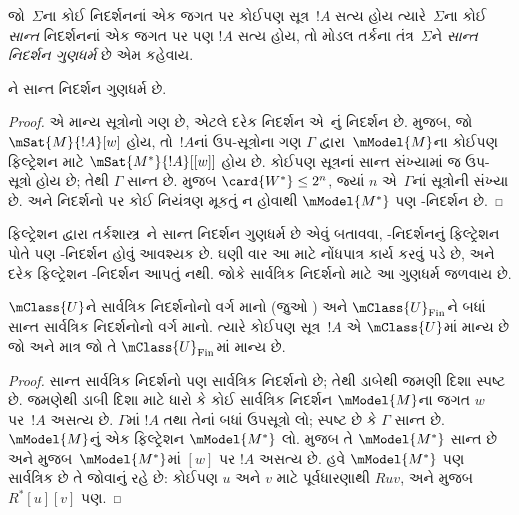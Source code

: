 \begin{defn}
  જો~$\Sigma$ના કોઈ નિદર્શનનાં એક જગત પર કોઈપણ સૂત્ર~$!A$ સત્ય હોય
  ત્યારે~$\Sigma$ના કોઈ \emph{સાન્ત} નિદર્શનનાં એક જગત પર પણ $!A$
  સત્ય હોય, તો મોડલ તર્કના તંત્ર~$\Sigma$ને \emph{સાન્ત
    નિદર્શન ગુણધર્મ} છે એમ કહેવાય.
\end{defn}

\begin{prop}
  ને સાન્ત નિદર્શન ગુણધર્મ છે.
\end{prop}

\begin{proof}
   એ માન્ય સૂત્રોનો ગણ છે, એટલે દરેક નિદર્શન
  એ~નું નિદર્શન છે.  મુજબ,
  જો $\mSat{M}{!A}[w]$ હોય, તો~$!A$નાં ઉપ-સૂત્રોના ગણ
  $\Gamma$ દ્વારા~$\mModel{M}$ના કોઈપણ ફિલ્ટ્રેશન માટે
  $\mSat{M^*}{!A}[{[w]}]$ હોય છે.
  કોઈપણ સૂત્રનાં સાન્ત સંખ્યામાં જ ઉપ-સૂત્રો હોય છે;
  તેથી $\Gamma$ સાન્ત છે.  મુજબ
  $\card{W^*} \le 2^n$, જ્યાં $n$ એ~$\Gamma$નાં
  સૂત્રોની સંખ્યા છે. અને  નિદર્શનો પર કોઈ નિયંત્રણ
  મૂકતું ન હોવાથી $\mModel{M^*}$ પણ -નિદર્શન છે.
\end{proof}

ફિલ્ટ્રેશન દ્વારા તર્કશાસ્ત્ર~ને સાન્ત નિદર્શન ગુણધર્મ છે એવું
બતાવવા, -નિદર્શનનું ફિલ્ટ્રેશન પોતે પણ -નિદર્શન
હોવું આવશ્યક છે. ઘણી વાર આ માટે નોંધપાત્ર કાર્ય કરવું પડે છે, અને
દરેક ફિલ્ટ્રેશન -નિદર્શન આપતું નથી. જોકે સાર્વત્રિક
નિદર્શનો માટે આ ગુણધર્મ જળવાય છે.

\begin{prop}
  $\mClass{U}$ને સાર્વત્રિક નિદર્શનોનો વર્ગ માનો
  (જુઓ ) અને
  $\mClass{U}_\mathrm{Fin}$ને બધાં સાન્ત સાર્વત્રિક નિદર્શનોનો વર્ગ
  માનો. ત્યારે કોઈપણ સૂત્ર~$!A$ એ $\mClass{U}$માં માન્ય છે
  જો અને માત્ર જો તે $\mClass{U}_\mathrm{Fin}$માં માન્ય છે.
\end{prop}

\begin{proof}
  સાન્ત સાર્વત્રિક નિદર્શનો પણ સાર્વત્રિક નિદર્શનો છે; તેથી
  ડાબેથી જમણી દિશા સ્પષ્ટ છે. જમણેથી ડાબી દિશા માટે ધારો કે કોઈ
  સાર્વત્રિક નિદર્શન $\mModel{M}$ના જગત $w$ પર~$!A$ અસત્ય છે.
  $\Gamma$માં $!A$ તથા તેનાં બધાં ઉપસૂત્રો લો; સ્પષ્ટ છે કે
  $\Gamma$ સાન્ત છે. $\mModel{M}$નું એક ફિલ્ટ્રેશન
  $\mModel{M^*}$ લો.  મુજબ તે
  $\mModel{M^*}$ સાન્ત છે અને  મુજબ~$\mModel{M^*}$માં
  $[w]$ પર $!A$ અસત્ય છે. હવે $\mModel{M^*}$ પણ સાર્વત્રિક છે
  તે જોવાનું રહે છે: કોઈપણ $u$ અને $v$ માટે પૂર્વધારણાથી $Ruv$,
  અને %
   મુજબ $R^*[u][v]$ પણ.
\end{proof}

